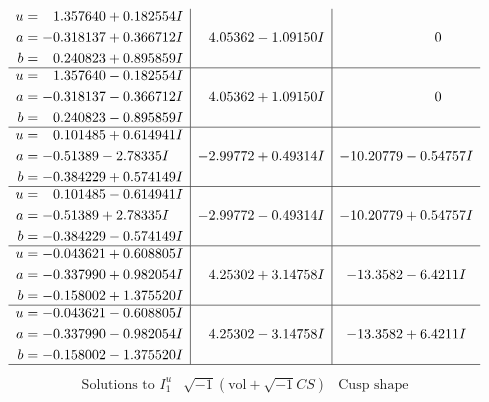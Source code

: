 \documentclass[1p]{elsarticle_modified}
\theoremstyle{definition}
\newcommand{\I}{\sqrt{-1}}
\begin{document}
$$\begin{array}{c|c|c}
\begin{aligned}
u &= \phantom{-}1.357640 + 0.182554 I \\
a &= -0.318137 + 0.366712 I \\
b &= \phantom{-}0.240823 + 0.895859 I\end{aligned}
 & \phantom{-}4.05362 - 1.09150 I & \phantom{-0.000000 } 0 \\ \hline\begin{aligned}
u &= \phantom{-}1.357640 - 0.182554 I \\
a &= -0.318137 - 0.366712 I \\
b &= \phantom{-}0.240823 - 0.895859 I\end{aligned}
 & \phantom{-}4.05362 + 1.09150 I & \phantom{-0.000000 } 0 \\ \hline\begin{aligned}
u &= \phantom{-}0.101485 + 0.614941 I \\
a &= -0.51389 - 2.78335 I \\
b &= -0.384229 + 0.574149 I\end{aligned}
 & -2.99772 + 0.49314 I & -10.20779 - 0.54757 I \\ \hline\begin{aligned}
u &= \phantom{-}0.101485 - 0.614941 I \\
a &= -0.51389 + 2.78335 I \\
b &= -0.384229 - 0.574149 I\end{aligned}
 & -2.99772 - 0.49314 I & -10.20779 + 0.54757 I \\ \hline\begin{aligned}
u &= -0.043621 + 0.608805 I \\
a &= -0.337990 + 0.982054 I \\
b &= -0.158002 + 1.375520 I\end{aligned}
 & \phantom{-}4.25302 + 3.14758 I & -13.3582 - 6.4211 I \\ \hline\begin{aligned}
u &= -0.043621 - 0.608805 I \\
a &= -0.337990 - 0.982054 I \\
b &= -0.158002 - 1.375520 I\end{aligned}
 & \phantom{-}4.25302 - 3.14758 I & -13.3582 + 6.4211 I\\
 \hline 
 \end{array}$$\newpage$$\begin{array}{c|c|c}  
\text{Solutions to }I^u_{1}& \I (\text{vol} + \sqrt{-1}CS) & \text{Cusp shape}\\
 \hline 
\begin{aligned}

\end{aligned}
\end{array}$$
\end{document}
